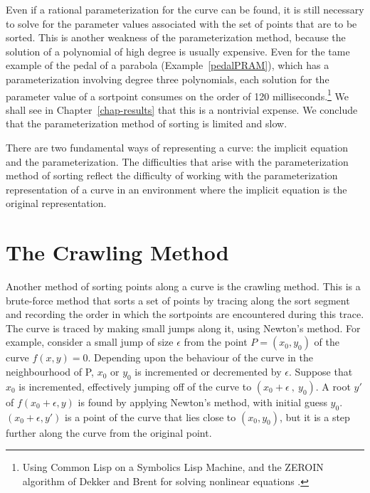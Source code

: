 Even if a rational parameterization for the curve can be found, it is still
necessary to solve for the parameter values associated with the set of points
that are to be sorted.
This is another weakness of the parameterization method,
because the solution of a polynomial of high degree is usually expensive.
Even for the tame example of the 
pedal of a parabola (Example~\ref{pedalPRAM}),
which has a parameterization involving degree three polynomials,
each solution for the parameter value of a sortpoint consumes
on the order of 120 milliseconds.\footnote{Using Common Lisp on a 
Symbolics Lisp Machine, and the ZEROIN algorithm of Dekker and Brent
for solving nonlinear equations \cite{forsythe}.}
We shall see in Chapter~\ref{chap-results} that this is a nontrivial expense.
We conclude that the parameterization method of sorting is limited and slow.

There are two fundamental ways of representing a curve: the implicit equation
and the parameterization. 
The difficulties that arise with the 
parameterization method of sorting reflect the difficulty of working
with the parameterization representation of a curve in an environment
where the implicit equation is the original representation.
%
\section{The Crawling Method}
\label{sec-crawl}

Another method of sorting points along a curve is the crawling method.
This is a brute-force method that sorts a set of points by tracing along
the sort segment and recording the order in which the sortpoints
are encountered during this trace.
The curve is traced by making small jumps along it, using
Newton's method.
For example, consider a small jump of size $\epsilon$ 
from the point \( P = (x_{0},y_{0}) \) of the 
curve \( f(x,y) = 0 \).
Depending upon the behaviour of the curve in the neighbourhood
of P, $x_{0}$ or $y_{0}$ is incremented or decremented by $\epsilon$.
Suppose that $x_{0}$ is incremented, effectively jumping off of the curve to 
\( (x_{0} + \epsilon\ ,\ y_{0}) \).
A root $y'$ of \( f(x_{0}+\epsilon,y) \) is found by applying
Newton's method, with initial guess $y_{0}$.
\( (x_{0}+\epsilon,y')\) is a point of the curve that
lies close to $(x_{0},y_{0})$, but it is a step
further along the curve from the original point.


